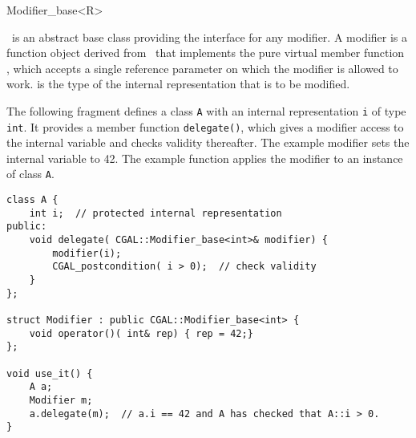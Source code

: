 \begin{ccRefClass}{Modifier_base<R>}
\label{sectionModifierBase}

\ccDefinition

\ccClassTemplateName\ is an abstract base class providing the
interface for any modifier. A modifier is a function object derived
from \ccClassTemplateName\ that implements the pure virtual member
function , which accepts a single reference parameter
 on which the modifier is allowed to work.   is the
type of the internal representation that is to be modified.


\ccTypes
{}
\ccThreeToTwo


\ccOperations
{}

\ccTagFullDeclarations
{}
    {}
\ccTagDefaults

\ccExample

The following fragment defines a class {\tt A} with an internal
representation {\tt i} of type {\tt int}. It provides a member
function {\tt delegate()}, which gives a modifier access to the
internal variable and checks validity thereafter.  The
example modifier sets the internal variable to 42. The example
function applies the modifier to an instance of class {\tt A}.

\begin{verbatim}
class A {
    int i;  // protected internal representation
public:
    void delegate( CGAL::Modifier_base<int>& modifier) {
        modifier(i);
        CGAL_postcondition( i > 0);  // check validity
    }
};

struct Modifier : public CGAL::Modifier_base<int> {
    void operator()( int& rep) { rep = 42;}
};

void use_it() {
    A a;
    Modifier m;
    a.delegate(m);  // a.i == 42 and A has checked that A::i > 0.
}
\end{verbatim}

\end{ccRefClass}

